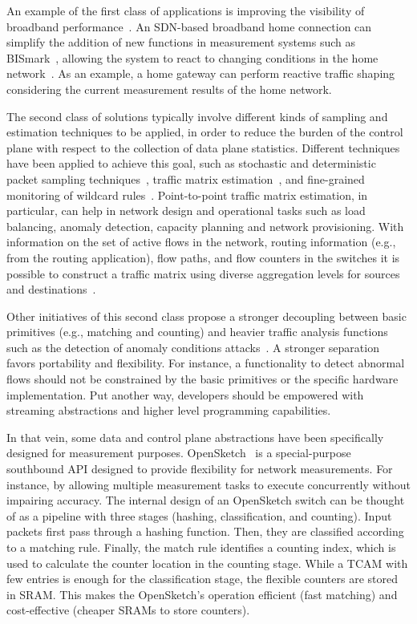 An example of the first class of applications is improving the visibility of broadband 
performance~\cite{sundaresan2011,kim2013}. An SDN-based broadband home connection can 
simplify the addition of new functions in measurement systems such as BISmark~\cite{sundaresan2011}, 
allowing the system to react to changing conditions in the home network~\cite{kim2013}. As an example, a home 
gateway can perform reactive traffic shaping considering the current measurement results of the home network.

The second class of solutions typically involve different kinds of sampling and estimation 
techniques to be applied, in order to reduce the burden of the control plane with respect to the collection of data plane statistics.
Different techniques have been applied to achieve this goal, such as stochastic and deterministic packet sampling techniques~\cite{mehdi2011}, traffic matrix estimation~\cite{tootoonchian2010-1}, and fine-grained monitoring of 
wildcard rules~\cite{wette2013}.
Point-to-point traffic matrix estimation, in particular, can help in network design and operational tasks such as load balancing, anomaly detection, capacity planning and 
network provisioning.
With information on the set of active flows in the network, routing information (e.g., from the routing application), flow paths, and flow counters in the switches it is possible to 
construct a traffic matrix using diverse aggregation levels for sources and destinations~\cite{tootoonchian2010-1}.

Other initiatives of this second class propose a stronger decoupling between basic primitives (e.g., matching and counting) and 
heavier traffic analysis functions such as the detection of anomaly conditions attacks~\cite{bianchi2013}.
A stronger separation favors portability and flexibility.
For instance, a functionality to detect abnormal flows should not be constrained by the basic primitives or 
the specific hardware implementation.
Put another way, developers should be empowered with streaming 
abstractions and higher level programming capabilities.

In that vein, some data and control plane abstractions have been specifically designed for measurement purposes.
OpenSketch~\cite{yu2013-1} is a special-purpose southbound API 
designed to provide flexibility for network measurements.
For instance, by allowing multiple measurement tasks to execute concurrently without impairing accuracy.
The internal design of an OpenSketch switch can be thought of as a pipeline with three stages (hashing, classification, and counting). 
Input packets first pass through a hashing function. 
Then, they are classified according to a matching rule.
Finally, the match rule identifies a counting index, which is used to calculate the counter location in the counting stage. While a TCAM with few 
entries is enough for the classification stage, the flexible counters are stored in SRAM.
This makes the OpenSketch's operation efficient (fast matching) and cost-effective (cheaper SRAMs to store counters).


